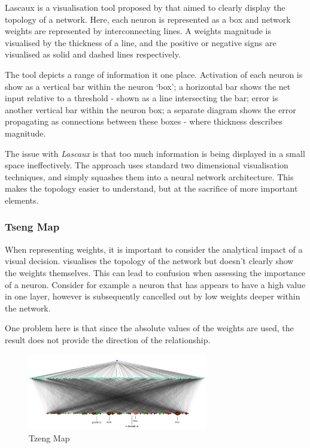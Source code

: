 \documentclass[a4paper,11pt,titlepage]{article}
\begin{document}
		Lascaux is a visualisation tool proposed by \cite{Craven1992} that aimed to clearly display the topology of a network. Here, each neuron is represented as a box and network weights are represented by interconnecting lines. A weights magnitude is visualised by the thickness of a line, and the positive or negative signs are visualised as solid and dashed lines respectively.
		\par 
		The tool depicts a range of information it one place. Activation of each neuron is show as a vertical bar within the neuron `box'; a horizontal bar shows the net input relative to a threshold - shown as a line intersecting the bar; error is another vertical bar within the neuron box; a separate diagram shows the error propagating as connections between these boxes - where thickness describes magnitude.
		\par 
		The issue with \textit{Lascaux} is that too much information is being displayed in a small space ineffectively. The approach uses standard two dimensional visualisation techniques, and simply squashes them into a neural network architecture. This makes the topology easier to understand, but at the sacrifice of more important elements.

\subsubsection{Tseng Map}
		When representing weights, it is important to consider the analytical impact of a visual decision. \cite{Streeter2001} visualises the topology of the network but doesn't clearly show the weights themselves. This can lead to confusion when assessing the importance of a neuron. Consider for example a neuron that has appears to have a high value in one layer, however is subsequently cancelled out by low weights deeper within the network.
	\par 
	One problem here is that since the absolute values of the weights are used, the result does not provide the direction of the relationship. 
	\par 
		
	\begin{figure}[H]
		\centering 
    		\includegraphics[width=0.7\textwidth]{img/tzeng_large_map.png} 
    		\caption{Tzeng Map}%
 	\end{figure}
 	
\end{document}
